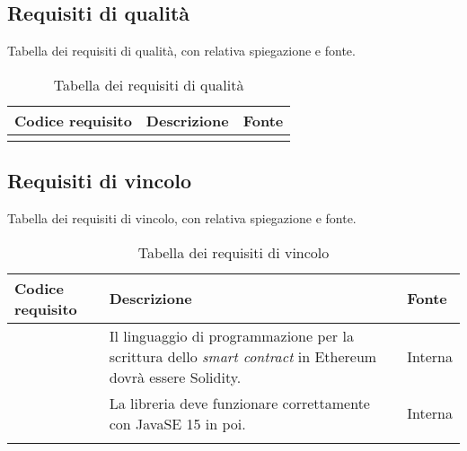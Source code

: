 \subsection{Requisiti di qualità}
Tabella dei requisiti di qualità, con relativa spiegazione e fonte.

\begin{longtabu}{|X[0.8,c]|X[3,c]|X[0.5,c]|}

  \hline 

  \textbf{Codice requisito} & \textbf{Descrizione} & \textbf{Fonte} \\ 
  
  \hline

  \caption{Tabella dei requisiti di qualità}
\end{longtabu}

\subsection{Requisiti di vincolo}
Tabella dei requisiti di vincolo, con relativa spiegazione e fonte.

\begin{longtabu}{|X[0.8,c]|X[3,c]|X[0.5,c]|}

  \hline 

  \textbf{Codice requisito} & \textbf{Descrizione} & \textbf{Fonte} \\

  \hline

   & Il linguaggio di programmazione per la scrittura dello \textit{smart contract} in Ethereum dovrà essere Solidity. & Interna \\ 
  
  \hline

   & La libreria deve funzionare correttamente con JavaSE 15 in poi. & Interna \\ 
  
  \hline

  \caption{Tabella dei requisiti di vincolo}
\end{longtabu}
